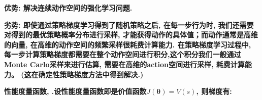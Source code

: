         \bf{优势}: 解决连续动作空间的强化学习问题.

        \bf{劣势}:
            即使通过策略梯度学习得到了随机策略之后, 在每一步行为时, 我们还需要对得到的最优策略概率分布进行采样, 才能获得动作的具体值；而动作通常是高维的向量, 在高维的动作空间的频繁采样很耗费计算能力. 在策略梯度学习过程中, 每一步计算策略梯度都需要在整个动作空间进行积分,这个积分我们一般通过Monte Carlo采样来进行估算, 需要在高维的action空间进行采样, 耗费计算能力。 (这在确定性策略梯度方法中得到解决.)

        \bf{性能度量函数}, .设性能度量函数即是价值函数$J(\boldsymbol{\theta}) = V(s)$, 则梯度有:
        
